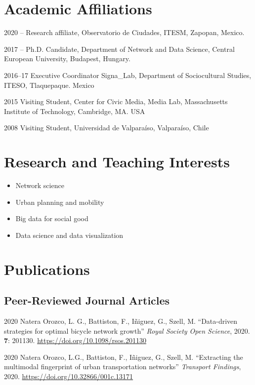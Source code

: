 \documentclass{academiccv}
\begin{document}
\section*{Academic Affiliations}
\begin{tablist}
	\item [2020 -- ] \tab Research affiliate, Observatorio de Ciudades, ITESM, Zapopan, Mexico.
	\item [2017 -- ] \tab Ph.D. Candidate, Department of Network and Data Science, Central European University, Budapest, Hungary.
	\item[2016--17] \tab Executive Coordinator Signa\_Lab, Department of Sociocultural Studies, ITESO, Tlaquepaque. Mexico
	\item[2015] \tab Visiting Student, Center for Civic Media,  Media Lab, Massachusetts Institute of Technology, Cambridge, MA. USA
	\item[2008] \tab Visiting Student, Universidad de Valparaíso, Valparaíso, Chile  
\end{tablist}



\section*{Research and Teaching Interests}
\begin{itemize}
	\item Network science
	\item Urban planning and mobility
	\item Big data for social good
	\item Data science and data visualization
\end{itemize}


\section*{Publications}
\subsection*{Peer-Reviewed Journal Articles}
\begin{tablist}
	\item[2020] \tab Natera Orozco, L. G., Battiston, F., I\~niguez, G., Szell, M. \enquote{Data-driven strategies for optimal bicycle network growth} \textit{Royal Society Open Science}, 2020. \textbf{7}: 201130. \url{https://doi.org/10.1098/rsos.201130}

	\item[2020] \tab Natera Orozco, L.G., Battiston, F., I\~niguez, G., Szell, M. \enquote{Extracting the multimodal fingerprint of urban transportation networks} \textit{Transport Findings}, 2020. \url{https://doi.org/10.32866/001c.13171}
\end{tablist}
\end{document}
